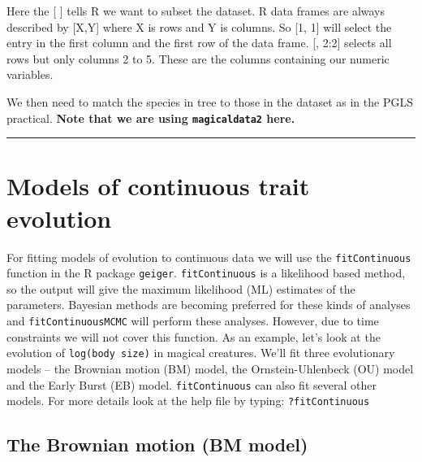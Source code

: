 \documentclass[]{book}
\newenvironment{Shaded}{\begin{snugshade}}{\end{snugshade}}
\newcommand{\KeywordTok}[1]{\textcolor[rgb]{0.13,0.29,0.53}{\textbf{{#1}}}}
\newcommand{\StringTok}[1]{\textcolor[rgb]{0.31,0.60,0.02}{{#1}}}
\newcommand{\NormalTok}[1]{{#1}}
\begin{document}
Here the {[} {]} tells R we want to subset the dataset. R data frames
are always described by {[}X,Y{]} where X is rows and Y is columns. So
{[}1, 1{]} will select the entry in the first column and the first row
of the data frame. {[}, 2:2{]} selects all rows but only columns 2 to 5.
These are the columns containing our numeric variables.

We then need to match the species in tree to those in the dataset as in
the PGLS practical. \textbf{Note that we are using \texttt{magicaldata2}
here.}

\begin{Shaded}
\end{Shaded}

\begin{center}\rule{0.5\linewidth}{\linethickness}\end{center}

\section{Models of continuous trait
evolution}\label{models-of-continuous-trait-evolution}

For fitting models of evolution to continuous data we will use the
\texttt{fitContinuous} function in the R package \texttt{geiger}.
\texttt{fitContinuous} is a likelihood based method, so the output will
give the maximum likelihood (ML) estimates of the parameters. Bayesian
methods are becoming preferred for these kinds of analyses and
\texttt{fitContinuousMCMC} will perform these analyses. However, due to
time constraints we will not cover this function. As an example, let's
look at the evolution of \texttt{log(body\ size)} in magical creatures.
We'll fit three evolutionary models -- the Brownian motion (BM) model,
the Ornstein-Uhlenbeck (OU) model and the Early Burst (EB) model.
\texttt{fitContinuous} can also fit several other models. For more
details look at the help file by typing: \texttt{?fitContinuous}

\subsection{The Brownian motion (BM
model)}\label{the-brownian-motion-bm-model}
\end{document}
